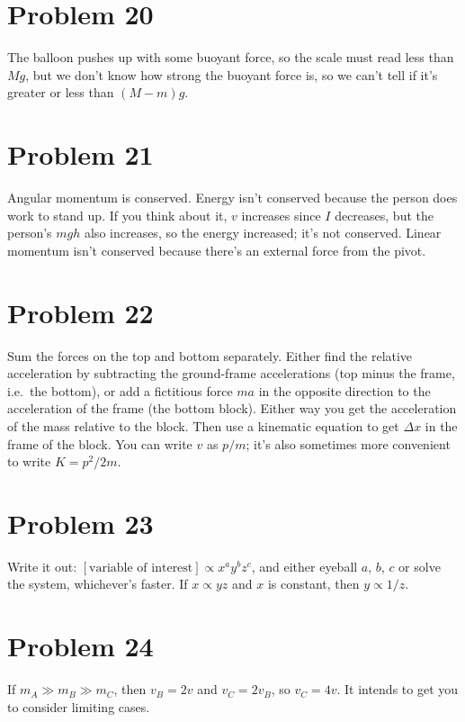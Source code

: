 \documentclass[11pt]{article}
\begin{document}
\section*{Problem 20}
The balloon pushes up with some buoyant force, so the scale must read less than $Mg$, but we don't know how strong the buoyant force is, so we can't tell if it's greater or less than $(M-m)g$.

\section*{Problem 21}
Angular momentum is conserved.
Energy isn't conserved because the person does work to stand up. If you think about it, $v$ increases since $I$ decreases, but the person's $mgh$ also increases, so the energy increased; it's not conserved.
Linear momentum isn't conserved because there's an external force from the pivot.

\section*{Problem 22}
Sum the forces on the top and bottom separately.
Either find the relative acceleration by subtracting the ground-frame accelerations (top minus the frame, i.e.\ the bottom), or add a fictitious force $ma$ in the opposite direction to the acceleration of the frame (the bottom block). Either way you get the acceleration of the mass relative to the block.
Then use a kinematic equation to get $\Delta x$ in the frame of the block.
You can write $v$ as $p/m$; it's also sometimes more convenient to write $K=p^2/2m$.

\section*{Problem 23}
Write it out: $[\text{variable of interest}]\propto x^ay^bz^c$, and either eyeball $a$, $b$, $c$ or solve the system, whichever's faster.
If $x\propto yz$ and $x$ is constant, then $y\propto 1/z$.

\section*{Problem 24}
If $m_A\gg m_B\gg m_C$, then $v_B=2v$ and $v_C=2v_B$, so $v_C=4v$.
It intends to get you to consider limiting cases.
\end{document}
